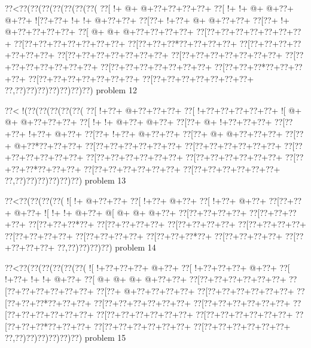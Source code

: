 \vbox{\vbox{\goo
\0??<\0??(\0??(\0??(\0??(\0??(\0??(\0??(
\0??[\- !+\- @+\- @+\0??+\0??+\0??+\0??+
\0??[\- !+\- !+\- @+\- @+\0??+\- @+\0??+
\- ![\0??+\0??+\- !+\- !+\- @+\0??+\0??+
\0??[\0??+\- !+\0??+\- @+\- @+\0??+\0??+
\0??[\0??+\- !+\- @+\0??+\0??+\0??+\0??+
\0??[\- @+\- @+\- @+\0??+\0??+\0??+\0??+
\0??[\0??+\0??+\0??+\0??+\0??+\0??+\0??+
\0??[\0??+\0??+\0??+\0??+\0??+\0??+\0??+
\0??[\0??+\0??+\0??*\0??+\0??+\0??+\0??+
\0??[\0??+\0??+\0??+\0??+\0??+\0??+\0??+
\0??[\0??+\0??+\0??+\0??+\0??+\0??+\0??+
\0??[\0??+\0??+\0??+\0??+\0??+\0??+\0??+
\0??[\0??+\0??+\0??+\0??+\0??+\0??+\0??+
\0??[\0??+\0??+\0??+\0??+\0??+\0??+\0??+
\0??[\0??+\0??+\0??*\0??+\0??+\0??+\0??+
\0??[\0??+\0??+\0??+\0??+\0??+\0??+\0??+
\0??[\0??+\0??+\0??+\0??+\0??+\0??+\0??+
\0??,\0??)\0??)\0??)\0??)\0??)\0??)\0??)
}
\hfil problem 12\hfil\break
}

\vbox{\vbox{\goo
\0??<\- !(\0??(\0??(\0??(\0??(\0??(
\0??[\- !+\0??+\- @+\0??+\0??+\0??+
\0??[\- !+\0??+\0??+\0??+\0??+\0??+
\- ![\- @+\- @+\- @+\0??+\0??+\0??+
\0??[\- !+\- !+\- @+\0??+\- @+\0??+
\0??[\0??+\- @+\- !+\0??+\0??+\0??+
\0??[\0??+\0??+\- !+\0??+\- @+\0??+
\0??[\0??+\- !+\0??+\- @+\0??+\0??+
\0??[\0??+\- @+\- @+\0??+\0??+\0??+
\0??[\0??+\- @+\0??*\0??+\0??+\0??+
\0??[\0??+\0??+\0??+\0??+\0??+\0??+
\0??[\0??+\0??+\0??+\0??+\0??+\0??+
\0??[\0??+\0??+\0??+\0??+\0??+\0??+
\0??[\0??+\0??+\0??+\0??+\0??+\0??+
\0??[\0??+\0??+\0??+\0??+\0??+\0??+
\0??[\0??+\0??+\0??*\0??+\0??+\0??+
\0??[\0??+\0??+\0??+\0??+\0??+\0??+
\0??[\0??+\0??+\0??+\0??+\0??+\0??+
\0??,\0??)\0??)\0??)\0??)\0??)\0??)
}
\hfil problem 13\hfil\break
}

\vbox{\vbox{\goo
\0??<\0??(\0??(\0??(\0??(
\- ![\- !+\- @+\0??+\0??+
\0??[\- !+\0??+\- @+\0??+
\0??[\- !+\0??+\- @+\0??+
\0??[\0??+\0??+\- @+\0??+
\- ![\- !+\- !+\- @+\0??+
\- @[\- @+\- @+\- @+\0??+
\0??[\0??+\0??+\0??+\0??+
\0??[\0??+\0??+\0??+\0??+
\0??[\0??+\0??+\0??*\0??+
\0??[\0??+\0??+\0??+\0??+
\0??[\0??+\0??+\0??+\0??+
\0??[\0??+\0??+\0??+\0??+
\0??[\0??+\0??+\0??+\0??+
\0??[\0??+\0??+\0??+\0??+
\0??[\0??+\0??+\0??*\0??+
\0??[\0??+\0??+\0??+\0??+
\0??[\0??+\0??+\0??+\0??+
\0??,\0??)\0??)\0??)\0??)
}
\hfil problem 14\hfil\break
}

\vbox{\vbox{\goo
\0??<\0??(\0??(\0??(\0??(\0??(\0??(
\- ![\- !+\0??+\0??+\0??+\- @+\0??+
\0??[\- !+\0??+\0??+\0??+\- @+\0??+
\0??[\- !+\0??+\- !+\- !+\- @+\0??+
\0??[\- @+\- @+\- @+\- @+\0??+\0??+
\0??[\0??+\0??+\0??+\0??+\0??+\0??+
\0??[\0??+\0??+\0??+\0??+\0??+\0??+
\0??[\0??+\- @+\0??+\0??+\0??+\0??+
\0??[\0??+\0??+\0??+\0??+\0??+\0??+
\0??[\0??+\0??+\0??*\0??+\0??+\0??+
\0??[\0??+\0??+\0??+\0??+\0??+\0??+
\0??[\0??+\0??+\0??+\0??+\0??+\0??+
\0??[\0??+\0??+\0??+\0??+\0??+\0??+
\0??[\0??+\0??+\0??+\0??+\0??+\0??+
\0??[\0??+\0??+\0??+\0??+\0??+\0??+
\0??[\0??+\0??+\0??*\0??+\0??+\0??+
\0??[\0??+\0??+\0??+\0??+\0??+\0??+
\0??[\0??+\0??+\0??+\0??+\0??+\0??+
\0??,\0??)\0??)\0??)\0??)\0??)\0??)
}
\hfil problem 15\hfil\break
}

